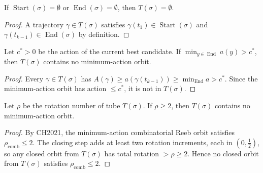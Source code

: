 
\begin{unverified}
\begin{lemma}\label{lem:prune-empty}
If $\operatorname{Start}(\sigma) = \emptyset$ or $\operatorname{End}(\sigma) = \emptyset$,
then $T(\sigma) = \emptyset$.
\end{lemma}

\begin{proof}
A trajectory $\gamma \in T(\sigma)$ satisfies
$\gamma(t_1) \in \operatorname{Start}(\sigma)$ and
$\gamma(t_{k-1}) \in \operatorname{End}(\sigma)$ by definition.
\end{proof}
\end{unverified}


\begin{unverified}
\begin{lemma}\label{lem:prune-action}
Let $c^* > 0$ be the action of the current best candidate.
If $\min_{y \in \operatorname{End}} a(y) > c^*$,
then $T(\sigma)$ contains no minimum-action orbit.
\end{lemma}

\begin{proof}
Every $\gamma \in T(\sigma)$ has
$A(\gamma) \geq a(\gamma(t_{k-1})) \geq \min_{\operatorname{End}} a > c^*$.
Since the minimum-action orbit has action $\leq c^*$, it is not in $T(\sigma)$.
\end{proof}
\end{unverified}


\begin{unverified}
\begin{lemma}\label{lem:prune-rotation}
Let $\rho$ be the rotation number of tube $T(\sigma)$.
If $\rho \geq 2$, then $T(\sigma)$ contains no minimum-action orbit.
\end{lemma}

\begin{proof}
By CH2021, the minimum-action combinatorial Reeb orbit satisfies
$\rho_{\mathrm{comb}} \leq 2$.
The closing step adds at least two
rotation increments, each in $(0, \tfrac{1}{2})$,
so any closed orbit from $T(\sigma)$ has total rotation
$> \rho \geq 2$.
Hence no closed orbit from $T(\sigma)$ satisfies
$\rho_{\mathrm{comb}} \leq 2$.
\end{proof}
\end{unverified}


